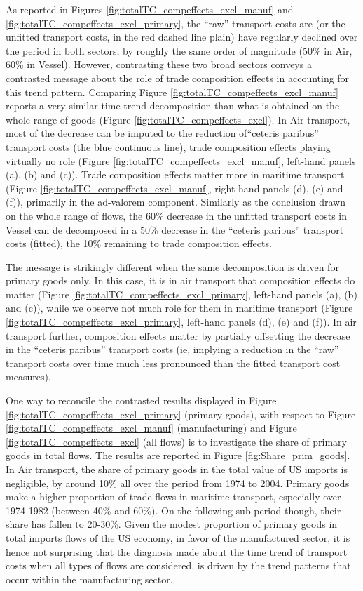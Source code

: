 \documentclass[11pt,twoside, authoryear]{elsarticle}
\begin{document}
As reported in Figures \ref{fig:totalTC_compeffects_excl_manuf} and \ref{fig:totalTC_compeffects_excl_primary}, the ``raw'' transport costs are (or the unfitted transport costs, in the red dashed line plain) have regularly declined over the period in both sectors, by roughly the same order of magnitude (50\% in Air, 60\% in Vessel). However, contrasting these two broad sectors conveys a contrasted message about the role of trade composition effects in accounting for this trend pattern. Comparing Figure \ref{fig:totalTC_compeffects_excl_manuf} reports a very similar time trend decomposition than what is obtained on the whole range of goods (Figure \ref{fig:totalTC_compeffects_excl}). In Air transport, most of the decrease can be imputed to the reduction of``ceteris paribus'' transport costs (the blue continuous line), trade composition effects playing virtually no role (Figure \ref{fig:totalTC_compeffects_excl_manuf}, left-hand panels (a), (b) and (c)). Trade composition effects matter more in maritime transport (Figure \ref{fig:totalTC_compeffects_excl_manuf}, right-hand panels (d), (e) and (f)), primarily in the ad-valorem component. Similarly as the conclusion drawn on the whole range of flows, the 60\% decrease in the unfitted transport costs in Vessel can de decomposed in a 50\% decrease in the ``ceteris paribus'' transport costs (fitted), the 10\% remaining to trade composition effects.

The message is strikingly different when the same decomposition is driven for primary goods only. In this case, it is in air transport that composition effects do matter (Figure \ref{fig:totalTC_compeffects_excl_primary}, left-hand panels (a), (b) and (c)), while we observe not much role for them in maritime transport (Figure \ref{fig:totalTC_compeffects_excl_primary}, left-hand panels (d), (e) and (f)). In air transport further, composition effects matter by partially offsetting the decrease in the ``ceteris paribus'' transport costs (ie, implying a reduction in the ``raw'' transport costs over time much less pronounced than the fitted transport cost measures).

One way to reconcile the contrasted results displayed in Figure \ref{fig:totalTC_compeffects_excl_primary} (primary goods), with respect to Figure \ref{fig:totalTC_compeffects_excl_manuf} (manufacturing) and Figure \ref{fig:totalTC_compeffects_excl} (all flows) is to investigate the share of primary goods in total flows. The results are reported in Figure \ref{fig:Share_prim_goods}. In Air transport, the share of primary goods in the total value of US imports is negligible, by around 10\% all over the period from 1974 to 2004. Primary goods make a higher proportion of trade flows in maritime transport, especially over 1974-1982 (between 40\% and 60\%). On the following sub-period though, their share has fallen to 20-30\%. Given the modest proportion of primary goods in total imports flows of the US economy, in favor of the manufactured sector, it is hence not surprising that the diagnosis made about the time trend of transport costs when all types of flows are considered, is driven by the trend patterns that occur within the manufacturing sector.
\end{document}
